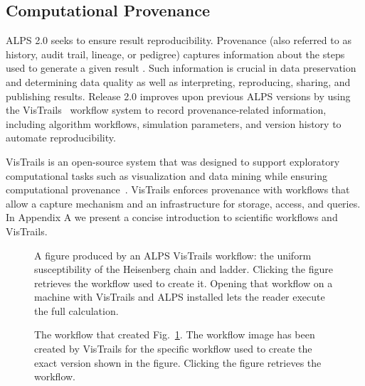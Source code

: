 \documentclass[12pt]{iopart}
\begin{document}
\subsection{Computational Provenance}

ALPS 2.0 seeks to ensure result reproducibility. Provenance (also
referred to as history, audit trail, lineage, or pedigree) captures
information about the steps used to generate a given result
\cite{Silva07,Freire08}. Such information is crucial in data
preservation and determining data quality as well as interpreting,
reproducing, sharing, and publishing results. Release 2.0 improves
upon previous ALPS versions by using the VisTrails~\cite{vistrails}
workflow system to record provenance-related information, including
algorithm workflows, simulation parameters, and version history to automate
reproducibility.

VisTrails is an open-source system that was designed to support
exploratory computational tasks such as visualization and data mining
while ensuring computational provenance~\cite{vistrails,Bavoil05}.
VisTrails enforces provenance with workflows that allow a capture
mechanism and an infrastructure for storage, access, and queries. In Appendix A we present a concise introduction to scientific workflows and VisTrails.

\begin{figure}
\begin{center}

\caption{A figure produced by an ALPS VisTrails workflow: the uniform susceptibility of the Heisenberg chain and ladder. Clicking the figure retrieves the workflow used to 
create it. Opening that workflow on a machine with VisTrails and ALPS installed lets the reader execute the full calculation.}
\label{fig:figure}
\end{center}
\end{figure}

\begin{figure}
\begin{center}
\caption{The workflow that created Fig.~\ref{fig:figure}. The workflow image has been created by VisTrails for the specific workflow used to create the exact version shown in the figure. Clicking the figure retrieves the workflow.}
\label{fig:workflow}
\end{center}
\end{figure}
\end{document}
